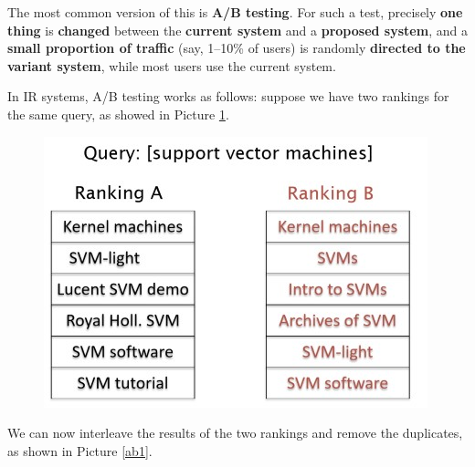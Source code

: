 The most common version of this is \textbf{A/B testing}. For such a test, precisely \textbf{one thing} is \textbf{changed} between the \textbf{current system} and a \textbf{proposed system}, and a \textbf{small proportion of traffic} (say, 1–10\% of users) is randomly \textbf{directed to the variant system}, while most users use the current system. 

In IR systems, A/B testing works as follows: suppose we have two rankings for the same query, as showed in Picture \ref{ab}.

\begin{figure}[h!]
		\centering
		\includegraphics[scale = 2.0]{img/ab.jpg}
		\label{ab}
\end{figure}

We can now interleave the results of the two rankings and remove the duplicates, as shown in Picture \ref{ab1}.

